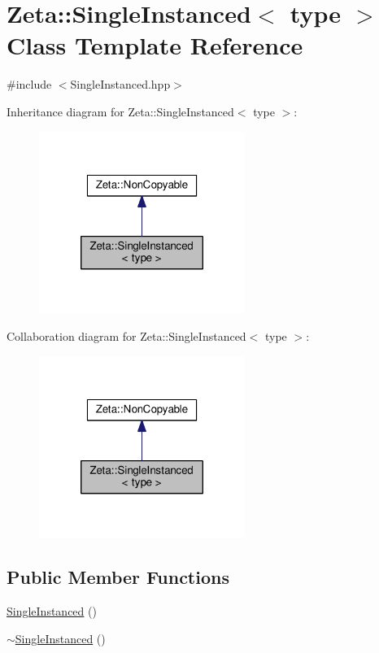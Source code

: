 \hypertarget{classZeta_1_1SingleInstanced}{\section{Zeta\+:\+:Single\+Instanced$<$ type $>$ Class Template Reference}
\label{classZeta_1_1SingleInstanced}
}


{\ttfamily \#include $<$Single\+Instanced.\+hpp$>$}



Inheritance diagram for Zeta\+:\+:Single\+Instanced$<$ type $>$\+:\nopagebreak
\begin{figure}[H]
\begin{center}
\leavevmode
\includegraphics[width=190pt]{classZeta_1_1SingleInstanced__inherit__graph}
\end{center}
\end{figure}


Collaboration diagram for Zeta\+:\+:Single\+Instanced$<$ type $>$\+:\nopagebreak
\begin{figure}[H]
\begin{center}
\leavevmode
\includegraphics[width=190pt]{classZeta_1_1SingleInstanced__coll__graph}
\end{center}
\end{figure}
\subsection*{Public Member Functions}
\begin{DoxyCompactItemize}
\item 
\hyperlink{classZeta_1_1SingleInstanced_a85ddd9cc6b8c4cb46db4316c802f08fc}{Single\+Instanced} ()
\item 
\hyperlink{classZeta_1_1SingleInstanced_a7ef99cce1bdb94956f35e043af1e3d0c}{$\sim$\+Single\+Instanced} ()
\end{DoxyCompactItemize}
